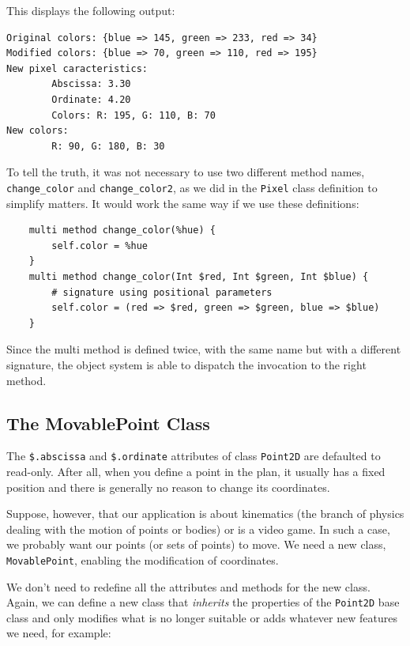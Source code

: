 This displays the following output:

\begin{verbatim}
Original colors: {blue => 145, green => 233, red => 34}
Modified colors: {blue => 70, green => 110, red => 195}
New pixel caracteristics:
        Abscissa: 3.30
        Ordinate: 4.20
        Colors: R: 195, G: 110, B: 70
New colors:  
        R: 90, G: 180, B: 30
\end{verbatim}

To tell the truth, it was not necessary to use two different 
method names, \verb'change_color' and \verb'change_color2', as 
we did in the {\tt Pixel} class definition to simplify matters. 
It would work the same way if we use these definitions:

\begin{verbatim}
    multi method change_color(%hue) {
        self.color = %hue
    }
    multi method change_color(Int $red, Int $green, Int $blue) {
        # signature using positional parameters
        self.color = (red => $red, green => $green, blue => $blue)
    }
\end{verbatim} 

Since the multi method is defined twice, with the same name but 
with a different signature, the object system is able to 
dispatch the invocation to the right method.


\subsection{The MovablePoint Class}

The \verb'$.abscissa' and \verb'$.ordinate' attributes of 
class {\tt Point2D} are defaulted to read-only. After all, 
when you define a point in the plan, it usually has a fixed 
position and there is generally no reason to change its 
coordinates.

Suppose, however, that our application is about kinematics 
(the branch of physics dealing with the motion of points or 
bodies) or is a video game. In such a case, we probably want 
our points (or sets of points) to move. We need a new class, 
{\tt MovablePoint}, enabling the modification of coordinates.

We don't need to redefine all the attributes and methods for 
the new class. Again, we can define a new class that 
\emph{inherits} the properties of the {\tt Point2D} base class 
and only modifies what is no longer suitable or adds whatever 
new features we need, for example:

